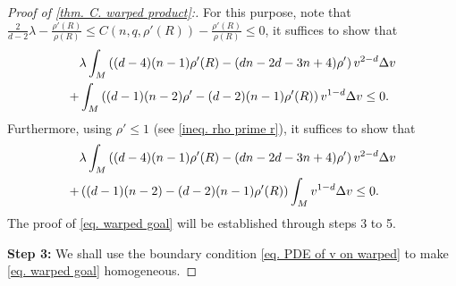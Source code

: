 \documentclass[12pt]{amsart}%
\numberwithin{equation}{section}
\numberwithin{lemma}{section}
\numberwithin{proposition}{section}
\numberwithin{corollary}{section}
\numberwithin{remark}{section}
\begin{document}
\begin{proof}[Proof of \cref{thm. C. warped product}:]
    For this purpose, note that $\frac{2}{d-2}\lambda-\frac{\rho'(R)}{\rho(R)}
    \leq C(n,q,\rho'(R))-\frac{\rho'(R)}{\rho(R)}
    \leq 0$, it suffices to show that
    \begin{align*}
        &\lambda
        \int_M
        \left(
        (d-4)(n-1)\rho'(R)-(dn-2d-3n+4)\rho'
        \right)
         v^{2-d}\Delta v\notag
        \\
        +&\int_M 
        \left((d-1)(n-2)\rho'
        -(d-2)(n-1)\rho'(R)
        \right)
        v^{1-d}\Delta v
        \leq 0.
    \end{align*}
    Furthermore,  using $\rho'\leq 1$ (see  \cref{ineq. rho prime r}), it suffices to show that
    \begin{align}\label{eq. warped goal}
        &\lambda
        \int_M
        \left(
        (d-4)(n-1)\rho'(R)-(dn-2d-3n+4)\rho'
        \right)
         v^{2-d}\Delta v\notag
        \\
        +&\left((d-1)(n-2)
        -(d-2)(n-1)\rho'(R)
        \right)
        \int_M 
        v^{1-d}\Delta v
        \leq 0.
    \end{align}
    The proof of \cref{eq. warped goal} will be established through steps 3 to 5.

    \textbf{Step 3:} We shall use the boundary condition \cref{eq. PDE of v on warped} to make \cref{eq. warped goal} homogeneous.
    

\end{proof}
\end{document}

